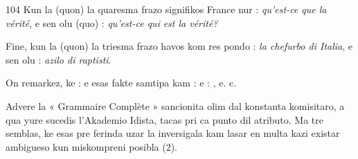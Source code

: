 \begin{VUpage}[108]{104}
Kun la  (quon) la quaresma frazo signifikos France\nl
nur : \textit{qu'est-ce que la vérité}, e sen olu (quo) : \textit{qu'est-ce qui}\nl
\textit{est la vérité?}

Fine, kun la  (quon) la triesma frazo havos kom res\cc
pondo : \textit{la chefurbo di Italia}, e sen olu : \textit{azilo di raptisti}.

On remarkez, ke : \nl
e  esas fakte samtipa\nl
kam :  e : , e. c.

Advere la « Grammaire Complète » sancionita olim dal\nl
konstanta komisitaro, a qua yure sucedis l'Akademio Idista,\nl
tacas pri ca punto dil atributo. Ma tre semblas, ke esas pre\cc
ferinda uzar la  inversigala kam lasar en multa kazi existar\nl
ambigueso kun miskompreni posibla (2).
\end{VUpage}

